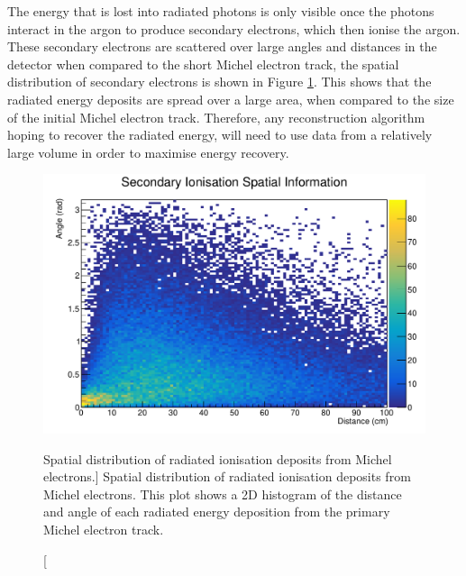 The energy that is lost into radiated photons is only visible once the photons
interact in the argon to produce secondary electrons, which then ionise the
argon. These secondary electrons are scattered over large angles and distances
in the detector when compared to the short Michel electron track, the spatial 
distribution of secondary electrons is shown in Figure \ref{fig:photon_geom}.
This shows that the radiated energy deposits are spread over a large area, when
compared to the size of the initial Michel electron track. Therefore, any 
reconstruction algorithm hoping to recover the radiated energy, will 
need to use data from a relatively large volume in order to maximise energy
recovery.
\begin{figure}
	\centering
	\includegraphics[width=\textwidth]{figures/photon_geom.pdf}
	\caption
	[Spatial distribution of radiated ionisation deposits from Michel electrons.]
	{Spatial distribution of radiated ionisation deposits from Michel electrons. 
	This plot shows a 2D histogram of the distance and angle of each radiated 
	energy deposition from the primary Michel electron track.}
	\label{fig:photon_geom}
\end{figure}

